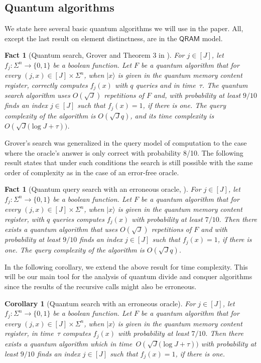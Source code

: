 \documentclass[12pt]{article}
\newcommand{\ket}[1]{|#1\rangle}
\newtheorem{corollary}[theorem]{Corollary}
\newtheorem{fact}[theorem]{Fact}
\theoremstyle{definition}
\begin{document}
\subsection{Quantum algorithms}
\label{subsec:qroutines}
We state here several basic quantum algorithms we will use in the paper.
All, except the last result on element distinctness, are in the  $\mathsf{QRAM}$ model.
\begin{fact}[{\sc Quantum search}, Grover \cite{grover1996fast} and Theorem 3 in \cite{BBHT98}]
\label{fact:search}
For $j \in [J]$, let $f_j : \Sigma^n \rightarrow \{0,1\}$ be a boolean function. Let $F$ be a quantum algorithm that for every $(j,x) \in [J] \times \Sigma^n$, 
when $\ket{x}$ is given in the quantum memory content register, correctly computes $f_j(x)$ with $q$ queries and in time~$\tau$.
The quantum search algorithm uses ${O}(\sqrt{J} )$ repetitions of $F$ and, with probability at least $9/10$ finds an index $j \in [J]$ such that $f_j(x)=1$, if there is one.
The query complexity of the algorithm is $O(\sqrt{J} q)$, and its time complexity is ${O}({\sqrt{J} ( \log J + \tau}))$.
\end{fact}


Grover's search was generalized in the query model of computation to the case where the oracle's answer is only correct with probability 8/10. The following result states that under such conditions the search is still possible with the same order of complexity as in the case of an error-free oracle.


\begin{fact}[{\sc Quantum query search with an erroneous oracle},
\cite{hoyer2003quantum}]
\label{fact:qseo}
For $j \in [J]$, let $f_j : \Sigma^n \rightarrow \{0,1\}$ be a boolean function. Let $F$ be a quantum algorithm that for every $(j,x) \in [J] \times \Sigma^n$, 
when $\ket{x}$ is given in the quantum memory content register, with $q$ queries computes $f_j(x)$ with probability at least $7/10.$
Then there exists a quantum algorithm that uses ${O}(\sqrt{J} )$ repetitions of $F$ and with probability at least $9/10$ finds an index $j \in [J]$ such that $f_j(x)=1$, if there is one.
The query complexity of the algorithm is $O(\sqrt{J} q)$.
\end{fact}

In the following corollary, we extend the above result for time complexity. This will be our main tool for the analysis of quantum divide and conquer algorithms since the results of the recursive calls might also be erroneous.
\begin{corollary}[{\sc Quantum search with an erroneous oracle}]
\label{cor:seo}
For $j \in [J]$, let $f_j : \Sigma^n \rightarrow \{0,1\}$ be a boolean function. Let $F$ be a quantum algorithm that for every $(j,x) \in [J] \times \Sigma^n$, when $\ket{x}$ is given in the quantum memory content register, in time~$\tau$ computes $f_j(x)$ with probability at least $7/10.$
Then there exists a quantum algorithm which in time~$O( {\sqrt{J} ( \log J + \tau}))$ with probability at least $9/10$ finds an index $j \in [J]$ such that $f_j(x)=1$, if there is one.
\end{corollary}
\end{document}
